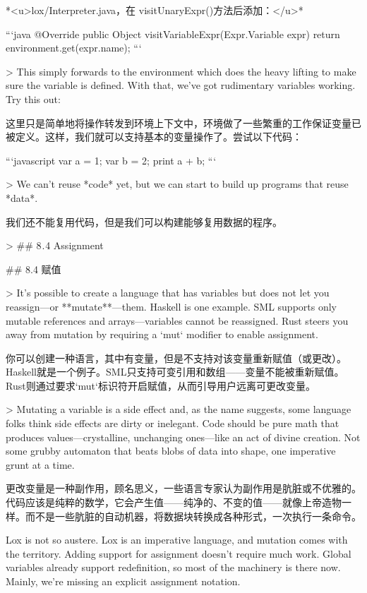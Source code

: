 \documentclass[cn,11pt,chinese]{elegantbook}
\begin{document}
{{{{{{{*<u>lox/Interpreter.java，在 visitUnaryExpr()方法后添加：</u>*

```java
  @Override
  public Object visitVariableExpr(Expr.Variable expr) {
    return environment.get(expr.name);
  }
```

> This simply forwards to the environment which does the heavy lifting to make sure the variable is defined. With that, we’ve got rudimentary variables working. Try this out:

这里只是简单地将操作转发到环境上下文中，环境做了一些繁重的工作保证变量已被定义。这样，我们就可以支持基本的变量操作了。尝试以下代码：

```javascript
var a = 1;
var b = 2;
print a + b;
```

> We can’t reuse *code* yet, but we can start to build up programs that reuse *data*.

我们还不能复用代码，但是我们可以构建能够复用数据的程序。

> ## 8 . 4 Assignment

## 8.4 赋值

> It’s possible to create a language that has variables but does not let you reassign—or **mutate**—them. Haskell is one example. SML supports only mutable references and arrays—variables cannot be reassigned. Rust steers you away from mutation by requiring a `mut` modifier to enable assignment.

你可以创建一种语言，其中有变量，但是不支持对该变量重新赋值（或更改）。Haskell就是一个例子。SML只支持可变引用和数组——变量不能被重新赋值。Rust则通过要求`mut`标识符开启赋值，从而引导用户远离可更改变量。

> Mutating a variable is a side effect and, as the name suggests, some language folks think side effects are dirty or inelegant. Code should be pure math that produces values—crystalline, unchanging ones—like an act of divine creation. Not some grubby automaton that beats blobs of data into shape, one imperative grunt at a time.

更改变量是一种副作用，顾名思义，一些语言专家认为副作用是肮脏或不优雅的。代码应该是纯粹的数学，它会产生值——纯净的、不变的值——就像上帝造物一样。而不是一些肮脏的自动机器，将数据块转换成各种形式，一次执行一条命令。

Lox is not so austere. Lox is an imperative language, and mutation comes with the territory. Adding support for assignment doesn’t require much work. Global variables already support redefinition, so most of the machinery is there now. Mainly, we’re missing an explicit assignment notation.

}}}}}}}
\end{document}
